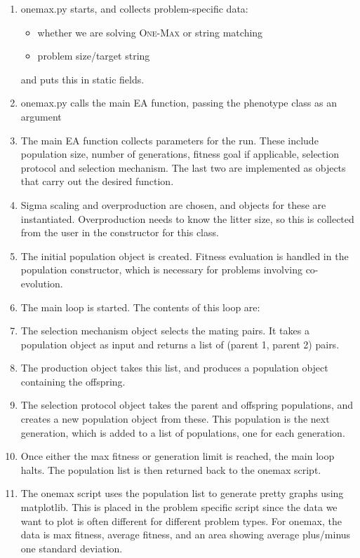 \documentclass[a4paper,12pt]{article}
\begin{document}
\begin{enumerate}
\item{onemax.py starts, and collects problem-specific data:
\begin{itemize}
\item{whether we are solving \textsc{One-Max} or string matching}
\item{problem size/target string}
\end{itemize}
and puts this in static fields.}
\item{onemax.py calls the main EA function, passing the phenotype class as an argument}
\item{The main EA function collects parameters for the run. These include population size, number of generations, fitness goal if applicable, selection protocol and selection mechanism. The last two are implemented as objects that carry out the desired function.}
\item{Sigma scaling and overproduction are chosen, and objects for these are instantiated. Overproduction needs to know the litter size, so this is collected from the user in the constructor for this class.}
\item{The initial population object is created. Fitness evaluation is handled in the population constructor, which is necessary for problems involving co-evolution.}
\item{The main loop is started. The contents of this loop are:}
\item{The selection mechanism object selects the mating pairs. It takes a population object as input and returns a list of (parent 1, parent 2) pairs.}
\item{The production object takes this list, and produces a population object containing the offspring.}
\item{The selection protocol object takes the parent and offspring populations, and creates a new population object from these. This population is the next generation, which is added to a list of populations, one for each generation.}
\item{Once either the max fitness or generation limit is reached, the main loop halts. The population list is then returned back to the onemax script.}
\item{The onemax script uses the population list to generate pretty graphs using matplotlib. This is placed in the problem specific script since the data we want to plot is often different for different problem types. For onemax, the data is max fitness, average fitness, and an area showing average plus/minus one standard deviation.}
\end{enumerate}
\end{document}
